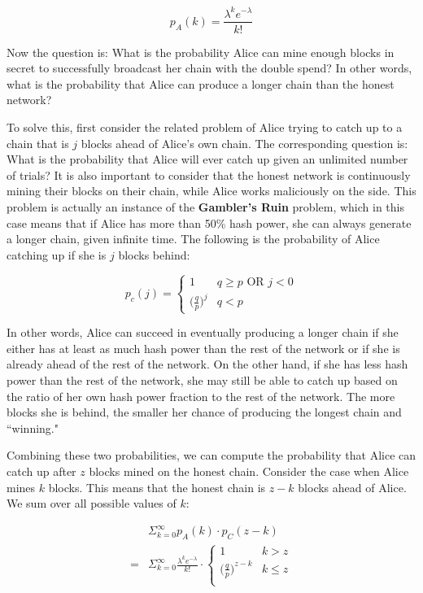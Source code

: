 \documentclass[full.tex]{subfiles}
\begin{document}
   $$p_A(k) = \frac{\lambda^k e^{-\lambda}}{k!}$$
   
   Now the question is: What is the probability Alice can mine enough blocks in secret to successfully broadcast her chain with the double spend? In other words, what is the probability that Alice can produce a longer chain than the honest network? 
   
   To solve this, first consider the related problem of Alice trying to catch up to a chain that is $j$ blocks ahead of Alice's own chain. The corresponding question is: What is the probability that Alice will ever catch up given an unlimited number of trials? It is also important to consider that the honest network is continuously mining their blocks on their chain, while Alice works maliciously on the side. This problem is actually an instance of the \textbf{Gambler's Ruin} problem, which in this case means that if Alice has more than 50\% hash power, she can always generate a longer chain, given infinite time. The following is the probability of Alice catching up if she is $j$ blocks behind: 
   
   \[ p_c(j) = \begin{cases} 
      1 & q \geq p \text{ OR } j < 0 \\
      \big(\frac{q}{p}\big)^j & q < p
   \end{cases}
   \]
   
   In other words, Alice can succeed in eventually producing a longer chain if she either has at least as much hash power than the rest of the network or if she is already ahead of the rest of the network. On the other hand, if she has less hash power than the rest of the network, she may still be able to catch up based on the ratio of her own hash power fraction to the rest of the network. The more blocks she is behind, the smaller her chance of producing the longest chain and ``winning."
   
   Combining these two probabilities, we can compute the probability that Alice can catch up after $z$ blocks mined on the honest chain. Consider the case when Alice mines $k$ blocks. This means that the honest chain is $z-k$ blocks ahead of Alice. We sum over all possible values of $k$:
   
   \begin{equation*}
       \begin{split}
           &\Sigma_{k=0}^\infty p_A(k) \cdot p_C(z-k) \\
           = &\Sigma_{k=0}^\infty \frac{\lambda^k e^{-\lambda}}{k!} \cdot  \left\{
    \begin{array}{ll}
      1  & k > z \\ 
      \big(\frac{q}{p}\big)^{z-k} & k \leq z \\
    \end{array}
  \right.
       \end{split}
   \end{equation*}
   
\end{document}
